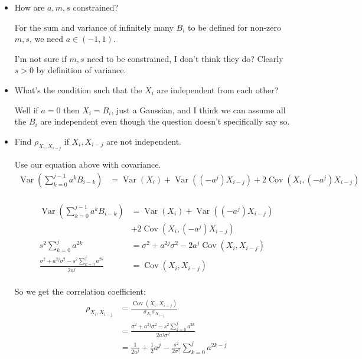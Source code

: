 \begin{itemize}
    \item How are $a,m,s$ constrained?
    
    For the sum and variance of infinitely many $B_i$ to be defined for non-zero $m,s$, we need $a \in (-1,1)$.

    I'm not sure if $m, s$ need to be constrained, I don't think they do? Clearly $s > 0$ by definition of variance.

    \item What's the condition such that the $X_i$ are independent from each other?

    Well if $a=0$ then $X_i = B_i$, just a Gaussian, and I think we can assume all the $B_i$ are independent even though the question doesn't specifically say so. 

    \item Find $\rho_{X_i,X_{i-j}}$ if $X_i,X_{i-j}$ are not independent.

    Use our equation above with covariance.
    \begin{align*}
        \operatorname{Var}(\sum_{k=0}^{j-1}a^kB_{i-k}) &= \operatorname{Var}(X_i) + \operatorname{Var}((-a^j)X_{i-j}) + 2\operatorname{Cov}(X_i, (-a^j)X_{i-j}) \\
    \end{align*}

        
    \begin{align*}
        \operatorname{Var}(\sum_{k=0}^{j-1}a^kB_{i-k}) &= \operatorname{Var}(X_i) + \operatorname{Var}((-a^j)X_{i-j}) \\
        &+ 2\operatorname{Cov}(X_i, (-a^j)X_{i-j}) \\
        s^2\sum_{k=0}^{j}a^{2k} &= \sigma^2 + a^{2j}\sigma^2 -2a^j\operatorname{Cov}(X_i, X_{i-j}) \\
        \frac{\sigma^2 + a^{2j}\sigma^2 - s^2\sum_{k=0}^{j}a^{2k}}{2a^j} &= \operatorname{Cov}(X_i, X_{i-j}) \\
    \end{align*}
    
    So we get the correlation coefficient:
    \begin{align*}
        \rho_{X_i,X_{i-j}} &= \frac{\operatorname{Cov}(X_i,X_{i-j})}{\sigma_{X_i} \sigma_{X_{i-j}}} \\
        &= \frac{\sigma^2 + a^{2j}\sigma^2 - s^2\sum_{k=0}^{j}a^{2k}}{2a^j\sigma^2} \\
        &= \frac{1}{2a^j} + \frac{1}{2}a^j - \frac{s^2}{2\sigma^2}\sum_{k=0}^{j}a^{2k-j}\\
    \end{align*}


\end{itemize}
